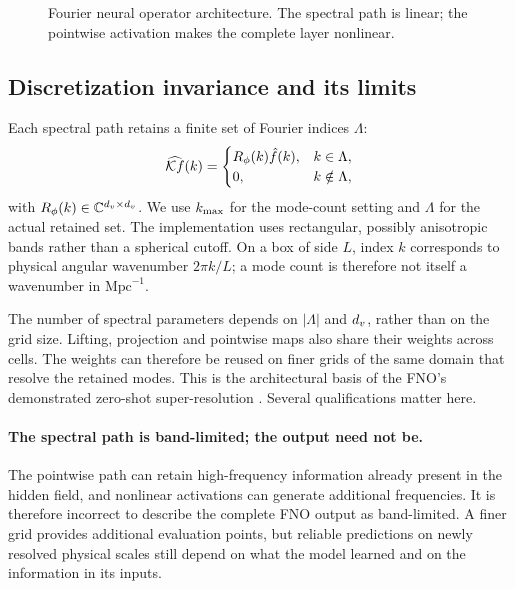 \begin{figure}[!tp]
  \centering
  \caption{Fourier neural operator architecture. The spectral path is linear; the pointwise activation makes the complete layer nonlinear.}
  \label{fig:fno-architecture}
\end{figure}

\subsection{Discretization invariance and its limits}
\label{sec:discretisation}

Each spectral path retains a finite set of Fourier indices $\Lambda$:
\begin{equation}
  \label{eq:mode-truncation}
  \widehat{\mathcal{K} f}(k)=
  \begin{cases}
    R_\phi(k)\hat f(k), & k\in\Lambda,\\
    0, & k\notin\Lambda,
  \end{cases}
\end{equation}
with $R_\phi(k)\in\mathbb{C}^{d_v\times d_v}$. We use $k_{\max}$ for the mode-count setting and $\Lambda$ for the actual retained set. The implementation uses rectangular, possibly anisotropic bands rather than a spherical cutoff. On a box of side $L$, index $k$ corresponds to physical angular wavenumber $2\pi k/L$; a mode count is therefore not itself a wavenumber in $\mathrm{Mpc}^{-1}$.

The number of spectral parameters depends on $|\Lambda|$ and $d_v$, rather than on the grid size. Lifting, projection and pointwise maps also share their weights across cells. The weights can therefore be reused on finer grids of the same domain that resolve the retained modes. This is the architectural basis of the FNO's demonstrated zero-shot super-resolution \citep{li2021fourier}. Several qualifications matter here.

\paragraph{The spectral path is band-limited; the output need not be.} The pointwise path can retain high-frequency information already present in the hidden field, and nonlinear activations can generate additional frequencies. It is therefore incorrect to describe the complete FNO output as band-limited. A finer grid provides additional evaluation points, but reliable predictions on newly resolved physical scales still depend on what the model learned and on the information in its inputs.

